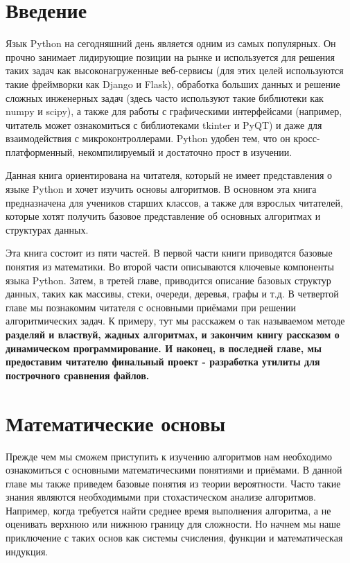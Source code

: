 \chapter*{Введение}

Язык Python на сегодняшний день является одним из самых популярных. 
Он прочно занимает лидирующие позиции на рынке и используется для решения таких
задач как высоконагруженные веб-сервисы (для этих целей используются 
такие фреймворки как Django и Flask), обработка больших данных и 
решение сложных инженерных задач (здесь часто 
используют такие библиотеки как numpy и scipy), а также для работы 
с графическими интерфейсами (например, читатель может ознакомиться с 
библиотеками tkinter и PyQT) и даже для взаимодействия с 
микроконтроллерами. Python удобен тем, что он кросс-платформенный, 
некомпилируемый и достаточно прост в изучении.

Данная книга ориентирована на читателя, который не имеет представления
о языке Python и хочет изучить основы алгоритмов. В основном эта книга 
предназначена для учеников старших классов, а также для взрослых читателей,
которые хотят получить базовое представление об основных алгоритмах 
и структурах данных.

Эта книга состоит из пяти частей. В первой части книги приводятся 
базовые понятия из математики. Во второй части описываются ключевые 
компоненты языка Python. Затем, в третей главе, приводится описание 
базовых структур данных, таких как массивы, стеки, очереди, деревья,
графы и т.д. В четвертой главе мы познакомим читателя с основными 
приёмами при решении алгоритмических задач. К примеру, тут мы расскажем
о так называемом методе \bf{разделяй и властвуй}, \bf{жадных алгоритмах},
и закончим книгу рассказом о \bf{динамическом программирование}.  
И наконец, в последней главе, мы предоставим читателю финальный проект - 
разработка утилиты для построчного сравнения файлов. 

\chapter{Математические основы}

Прежде чем мы сможем приступить к изучению алгоритмов нам необходимо ознакомиться
с основными математическими понятиями и приёмами. В данной главе мы также приведем
базовые понятия из теории вероятности. Часто такие знания являются необходимыми
при стохастическом анализе алгоритмов. Например, когда требуется найти среднее 
время выполнения алгоритма, а не оценивать верхнюю или нижнюю границу для сложности. 
Но начнем мы наше приключение с таких основ как системы счисления, 
функции и математическая индукция.

